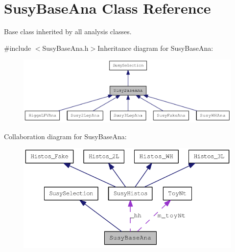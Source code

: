 \hypertarget{classSusyBaseAna}{
\section{SusyBaseAna Class Reference}
\label{classSusyBaseAna}
}


Base class inherited by all analysis classes.  


{\ttfamily \#include $<$SusyBaseAna.h$>$}Inheritance diagram for SusyBaseAna:\nopagebreak
\begin{figure}[H]
\begin{center}
\leavevmode
\includegraphics[width=400pt]{classSusyBaseAna__inherit__graph}
\end{center}
\end{figure}
Collaboration diagram for SusyBaseAna:\nopagebreak
\begin{figure}[H]
\begin{center}
\leavevmode
\includegraphics[width=372pt]{classSusyBaseAna__coll__graph}
\end{center}
\end{figure}
